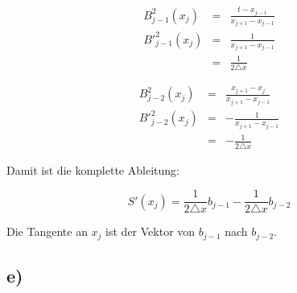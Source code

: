 \begin{eqnarray}
    B^2_{j-1}(x_j) &=& \frac{t - x_{j-1}}{x_{j+1} - x_{j-1}} \\
    B'^2_{j-1}(x_j)&=& \frac{1}{x_{j+1} - x_{j-1}}\\
    &=& \frac{1}{2 \triangle x}
\end{eqnarray}

\begin{eqnarray}
    B^2_{j-2}(x_j)&=& \frac{x_{j+1} - x_{j}}{x_{j+1} - x_{j-1}}\\
    B'^2_{j-2}(x_j)&=& -\frac{1}{x_{j+1} - x_{j-1}}\\
        &=& -\frac{1}{2 \triangle x}
\end{eqnarray}

Damit ist die komplette Ableitung:

\begin{equation}
    S'(x_j) =  \frac{1}{2 \triangle x} b_{j-1} - \frac{1}{2 \triangle x} b_{j-2}
\end{equation}

Die Tangente an $x_j$ ist der Vektor von $b_{j-1}$ nach $b_{j-2}$.
\subsection*{e)}


